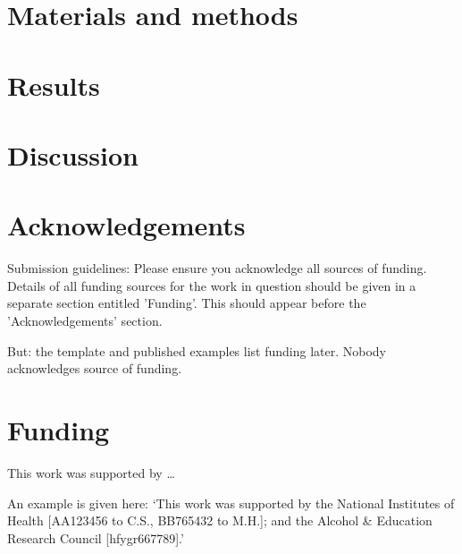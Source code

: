 \documentclass{bioinfo}
\begin{document}
\section{Materials and methods}



\section{Results}



\section{Discussion}



\section*{Acknowledgements}

Submission guidelines:
Please ensure you acknowledge all sources of funding.
Details of all funding sources for the work in question should be given in a separate section entitled 'Funding'. This should appear before the 'Acknowledgements' section.

But: the template and published examples list funding later.
Nobody acknowledges source of funding.
\vspace*{-12pt}



\section*{Funding}

This work was supported by \dots

An example is given here: ‘This work was supported by the National Institutes of Health [AA123456 to C.S., BB765432 to M.H.]; and the Alcohol \& Education Research Council [hfygr667789].’
\vspace*{-12pt}





\end{document}
